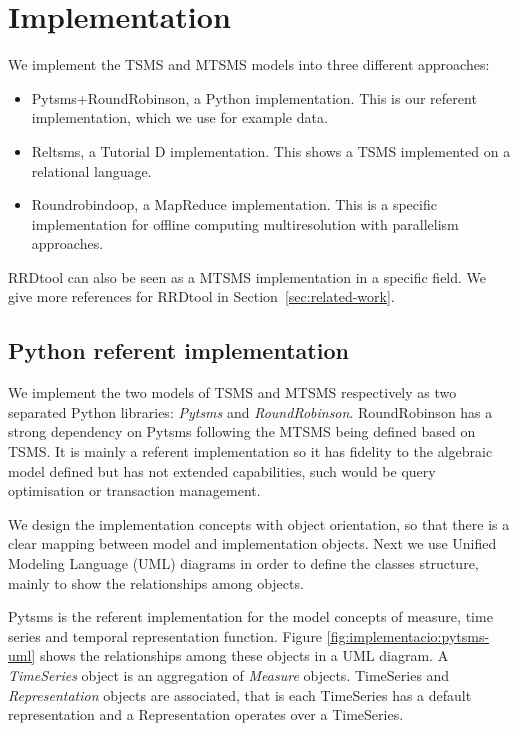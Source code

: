 
\section{Implementation}

\todo{}

We implement the TSMS and MTSMS models into three different approaches:

\begin{itemize}
\item Pytsms+RoundRobinson, a Python implementation. This is our referent
  implementation, which we use for example data.
\item Reltsms, a Tutorial D implementation. This shows a TSMS
  implemented on a relational language.
\item Roundrobindoop, a MapReduce implementation. This is a specific
  implementation for offline computing multiresolution with
  parallelism approaches.
\end{itemize}

RRDtool can also be seen as a MTSMS implementation in a specific
field. We give more references for RRDtool in
Section~\ref{sec:related-work}.



\subsection{Python referent implementation}

We implement the two models of TSMS and MTSMS respectively as two
separated Python libraries: \emph{Pytsms} and \emph{RoundRobinson}.
RoundRobinson has a strong dependency on Pytsms following the MTSMS
being defined based on TSMS.  It is mainly a referent implementation
so it has fidelity to the algebraic model defined but has not extended
 capabilities, such would be query optimisation or
transaction management.

We design the implementation concepts with object orientation, so that
there is a clear mapping between model and implementation
objects. Next we use Unified Modeling Language (UML) diagrams in order
to define the classes structure, mainly to show the relationships
among objects.



\todo{}


Pytsms is the referent implementation for the model concepts of
measure, time series and temporal representation function.  Figure
\ref{fig:implementacio:pytsms-uml} shows the relationships among these
objects in a UML diagram. A \emph{TimeSeries} object is an aggregation
of \emph{Measure} objects. TimeSeries and \emph{Representation}
objects are associated, that is each TimeSeries has a default
representation and a Representation operates over a TimeSeries.

